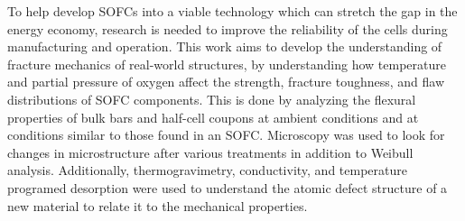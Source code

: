 
To help develop SOFCs into a viable technology which can stretch the gap in the energy economy, research is needed to improve the reliability of the cells during manufacturing and operation.
This work aims to develop the understanding of fracture mechanics of real-world structures, by understanding how temperature and partial pressure of oxygen affect the strength, fracture toughness, and flaw distributions of SOFC components.
This is done by analyzing the flexural properties of bulk bars and half-cell coupons at ambient conditions and at conditions similar to those found in an SOFC.
Microscopy was used to look for changes in microstructure after various treatments in addition to Weibull analysis.
Additionally, thermogravimetry, conductivity, and temperature programed desorption were used to understand the atomic defect structure of a new material to relate it to the mechanical properties.
